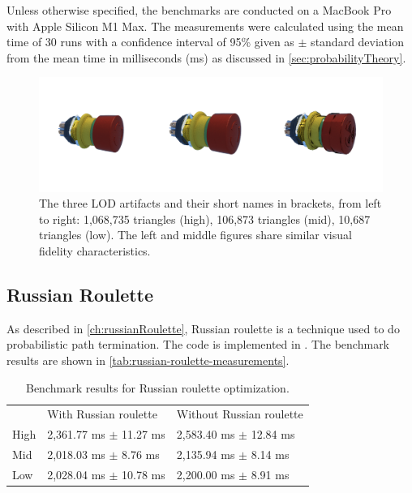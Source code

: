 Unless otherwise specified, the benchmarks are conducted on a MacBook Pro with Apple Silicon M1 Max. The measurements were calculated using the mean time of 30 runs with a confidence interval of 95\% given as $\pm$ standard deviation from the mean time in milliseconds (ms) as discussed in \autoref{sec:probabilityTheory}.

\begin{figure}[H]
    \includegraphics[width=0.9\columnwidth]{resources/benchmark-models.png}
    \caption{The three LOD artifacts and their short names in brackets, from left to right: 1,068,735 triangles (high), 106,873 triangles (mid), 10,687 triangles (low). The left and middle figures share similar visual fidelity characteristics.}
    \label{fig:benchmark-models}
\end{figure}

\subsection{Russian Roulette}

As described in \autoref{ch:russianRoulette}, Russian roulette is a technique used to do probabilistic path termination. The code is implemented in . The benchmark results are shown in \autoref{tab:russian-roulette-measurements}.

\begin{table}[H]
    \centering
    \begin{tabular}{@{}lll@{}}
    \toprule
    & With Russian roulette & Without Russian roulette \\
    High & 2,361.77 ms $\pm$ 11.27 ms & 2,583.40 ms $\pm$ 12.84 ms \\
    Mid & 2,018.03 ms $\pm$ 8.76 ms & 2,135.94 ms $\pm$ 8.14 ms \\
    Low & 2,028.04 ms $\pm$ 10.78 ms & 2,200.00 ms $\pm$ 8.91 ms \\
    \bottomrule
    \end{tabular}
    \caption{Benchmark results for Russian roulette optimization.}
    \label{tab:russian-roulette-measurements}
\end{table}

